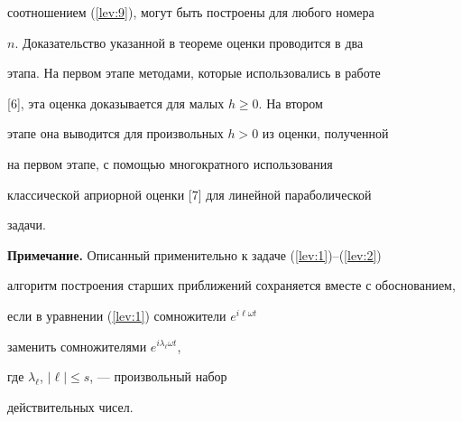 соотношением (\ref{lev:9}), могут быть построены для любого номера


$n$. Доказательство указанной в теореме оценки проводится в два


этапа. На первом этапе методами, которые использовались в работе


[6], эта оценка доказывается для малых $h\geqslant 0$. На втором


этапе она выводится для произвольных $h>0$ из оценки, полученной


на первом этапе, с помощью многократного использования


классической априорной оценки [7] для линейной параболической


задачи.





{\bf Примечание.} Описанный применительно к задаче (\ref{lev:1})--(\ref{lev:2})


алгоритм построения старших приближений сохраняется вместе с обоснованием,


если в уравнении (\ref{lev:1}) сомножители $e^{i\ell\omega t}$


заменить сомножителями $e^{i\lambda_{\ell}\omega t}$,


где $\lambda_\ell$, $|\ell|\leqslant s$, --- произвольный набор


действительных чисел.








